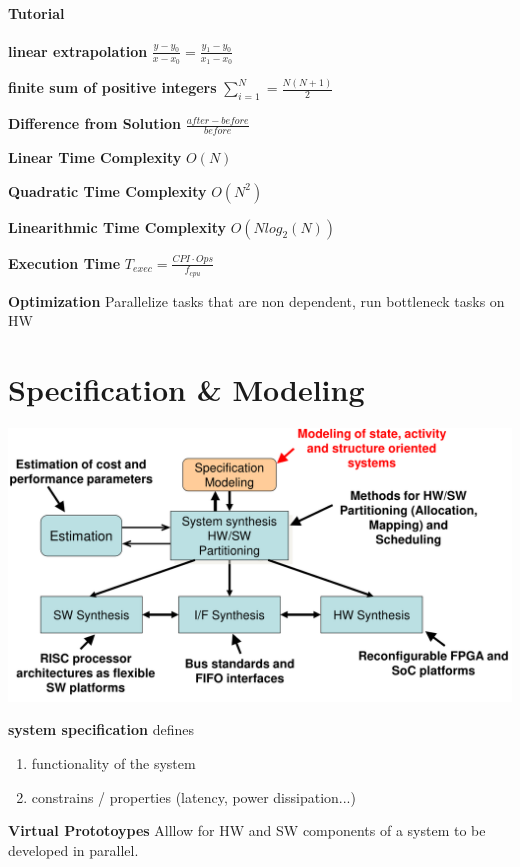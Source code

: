 \documentclass[english]{latex4ei/latex4ei_sheet}
\begin{document}
\paragraph{Tutorial}

\textbf{linear extrapolation} $\frac{y - y_0}{x - x_0} = \frac{y_1 - y_0}{x_1 - x_0}$

\textbf{finite sum of positive integers} $\sum_{i=1}^{N} = \frac{N(N+1)}{2}$

\textbf{Difference from Solution} $\frac{after - before}{before}$
 
\textbf{Linear Time Complexity} $ O(N)$

\textbf{Quadratic Time Complexity} $ O(N^2)$

\textbf{Linearithmic Time Complexity} $ O(N log_2(N))$

\textbf{Execution Time} $T_{exec} = \frac{CPI \cdot Ops}{f_{cpu}}$
 
\textbf{Optimization} Parallelize tasks that are non dependent, run bottleneck tasks on HW


\section{Specification \& Modeling}

\begin{center}
  \includegraphics[width=0.8\linewidth]{assets/DesignFlowSystemLevel.png}
\end{center}

\textbf{system specification} defines
\begin{enumerate}
	\item functionality of the system
	\item constrains / properties (latency, power dissipation...)
\end{enumerate}

\textbf{Virtual Prototoypes} Alllow for HW and SW components of a system to be developed in parallel.
\end{document}
